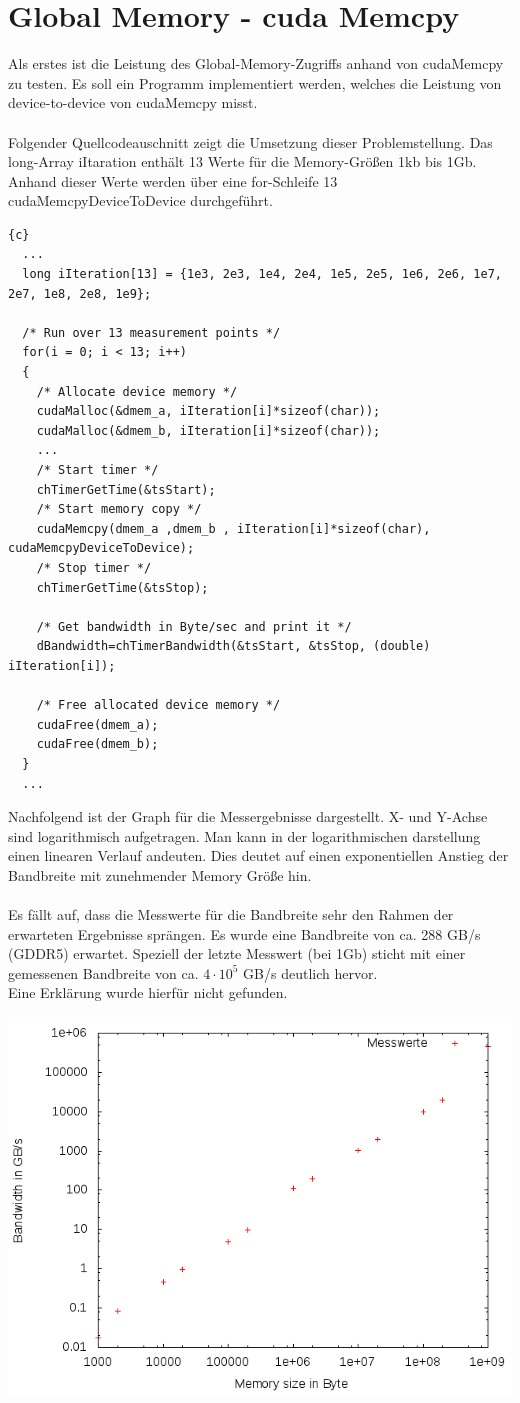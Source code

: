 \documentclass{article}
\newcommand{\enterProblemHeader}[1]{
}
\newcommand{\exitProblemHeader}[1]{
}
\newcounter{homeworkProblemCounter} %
\newcommand{\homeworkProblemName}{}
\newenvironment{homeworkProblem}[1][Problem \arabic{homeworkProblemCounter}]{ %
\stepcounter{homeworkProblemCounter} %
\renewcommand{\homeworkProblemName}{#1} %
\section{\homeworkProblemName} %
}{
}
\begin{document}
\begin{homeworkProblem}[Global Memory - cuda Memcpy]
Als erstes ist die Leistung des Global-Memory-Zugriffs anhand von cudaMemcpy zu testen.
Es soll ein Programm implementiert werden, welches die Leistung von device-to-device
von cudaMemcpy misst.
\\\\
Folgender Quellcodeauschnitt zeigt die Umsetzung dieser Problemstellung. Das long-Array
iItaration enthält 13 Werte für die Memory-Größen 1kb bis 1Gb. Anhand dieser Werte werden
über eine for-Schleife 13 cudaMemcpyDeviceToDevice durchgeführt.
\begin{lstlisting}{c}
  ...
  long iIteration[13] = {1e3, 2e3, 1e4, 2e4, 1e5, 2e5, 1e6, 2e6, 1e7, 2e7, 1e8, 2e8, 1e9};

  /* Run over 13 measurement points */
  for(i = 0; i < 13; i++)
  {
    /* Allocate device memory */
    cudaMalloc(&dmem_a, iIteration[i]*sizeof(char));
    cudaMalloc(&dmem_b, iIteration[i]*sizeof(char));
    ...
    /* Start timer */
    chTimerGetTime(&tsStart);
    /* Start memory copy */
    cudaMemcpy(dmem_a ,dmem_b , iIteration[i]*sizeof(char), cudaMemcpyDeviceToDevice);
    /* Stop timer */
    chTimerGetTime(&tsStop);

    /* Get bandwidth in Byte/sec and print it */
    dBandwidth=chTimerBandwidth(&tsStart, &tsStop, (double) iIteration[i]);

    /* Free allocated device memory */
    cudaFree(dmem_a);
    cudaFree(dmem_b);
  }
  ...
\end{lstlisting}
Nachfolgend ist der Graph für die Messergebnisse dargestellt. X- und Y-Achse sind
logarithmisch aufgetragen. Man kann in der logarithmischen darstellung einen linearen
Verlauf andeuten. Dies deutet auf einen exponentiellen Anstieg der Bandbreite mit
zunehmender Memory Größe hin.
\\\\
Es fällt auf, dass die Messwerte für die Bandbreite sehr den Rahmen der erwarteten
Ergebnisse sprängen. Es wurde eine Bandbreite von ca. 288 GB/s (GDDR5) erwartet.
Speziell der letzte Messwert (bei 1Gb) sticht mit einer gemessenen Bandbreite von 
ca. $ 4 \cdot 10^5 $ GB/s deutlich hervor.
\\
Eine Erklärung wurde hierfür nicht gefunden.
\begin{center}
\includegraphics[width=0.8\columnwidth]{../src/part_1/image.png}
\end{center}
\end{homeworkProblem}
\end{document}
